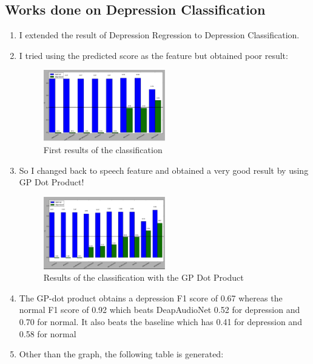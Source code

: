 \documentclass{article}
\begin{document}
    \subsection{Works done on Depression Classification}
    \begin{enumerate}
        \item I extended the result of Depression Regression to Depression Classification.
        \item I tried using the predicted score as the feature but obtained poor result:

        \begin{figure}[h]
 		    \begin{center}
		    \includegraphics[width=0.5\textwidth]{poor_results}
  		    \end{center}
  		    \caption{First results of the classification}
  		    \label{poor_results}
 	    \end{figure}

        \item So I changed back to speech feature and obtained a very good result by using GP Dot Product!

        \begin{figure}[h]
 		    \begin{center}
		    \includegraphics[width=0.5\textwidth]{gp_dot_product}
  		    \end{center}
  		    \caption{Results of the classification with the GP Dot Product}
  		    \label{gp_dot_product}
 	    \end{figure}

 	    \item The GP-dot product obtains a depression F1 score of 0.67 whereas the normal F1 score of 0.92 which beats DeapAudioNet 0.52 for depression and 0.70 for normal. It also beats the baseline which has 0.41 for depression and 0.58 for normal
        \item Other than the graph, the following table is generated:


\end{enumerate}
\end{document}
